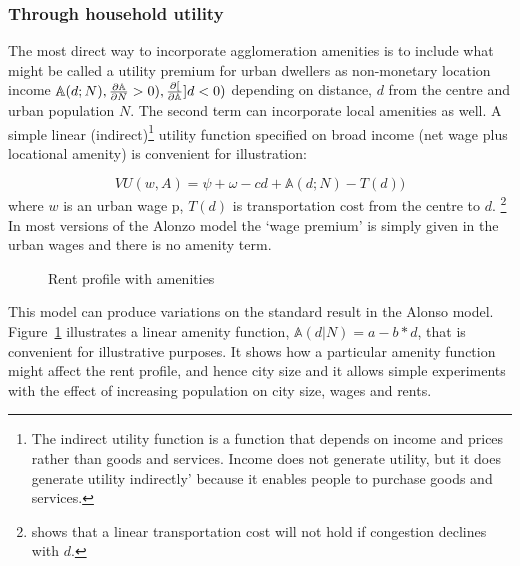 \subsubsection{Through household utility}
 The most direct way to incorporate agglomeration amenities is to include what might be called a \gls{utility premium} for urban dwellers as non-monetary location income $\mathbb{A}(d; N), \frac{\partial \mathbb{A}}{\partial N}> 0), \frac{\partial [}{\partial \mathbb{A}}]{d}< 0)$ depending on distance, $d$ from the centre and urban population $N$. The second term can incorporate local amenities as well. A simple linear (indirect)\footnote{The indirect utility function is a function that depends on income and prices rather than goods and services.  Income does not generate utility, but it does generate utility indirectly' because it enables people to purchase goods and services.} utility function specified on broad income (net wage plus locational amenity) is convenient for illustration:

\begin{equation}VU(w,A)= \psi+ \omega-cd + \mathbb{A}(d; N) - T(d))
\label{eqn-u}
\end{equation}
where $w$  is an urban wage p, $T(d)$ is transportation cost from the centre to $d$.
\footnote{\cite{anasUrbanSpatialStructure1998} shows that a linear transportation cost will not  hold if congestion declines  with $d$.} 
 In most versions of the Alonzo model the `wage premium' is simply given in the urban wages and there is no amenity term. 


 
\begin{figure}[t!b]
\begin{center}

\end{center}
\caption{Rent profile with amenities}
\label{fig-amenity}
\end{figure}

 This model can produce variations on the standard result in the Alonso model. Figure~\ref{fig-amenity} illustrates a linear amenity function, $\mathbb{A}(d|N)= a-b*d$, that is convenient for illustrative purposes.  It shows how a particular amenity function might affect the rent profile, and hence city size and it allows simple experiments with the effect of increasing population on city size, wages and rents. 

